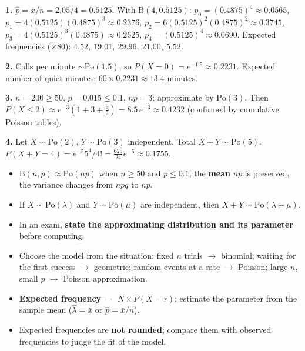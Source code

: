 \documentclass[11pt]{article}
\begin{document}
\begin{corrige}[Exercise 1]
\textbf{1.} $\hat p=\bar{x}/n=2.05/4=0.5125$. With $\mathrm{B}(4,0.5125)$: $p_0=(0.4875)^4\approx 0.0565$, $p_1=4(0.5125)(0.4875)^3\approx 0.2376$, $p_2=6(0.5125)^2(0.4875)^2\approx 0.3745$, $p_3=4(0.5125)^3(0.4875)\approx 0.2625$, $p_4=(0.5125)^4\approx 0.0690$. Expected frequencies ($\times 80$): $4.52,\ 19.01,\ 29.96,\ 21.00,\ 5.52$.

\textbf{2.} Calls per minute $\sim\mathrm{Po}(1.5)$, so $P(X=0)=e^{-1.5}\approx 0.2231$. Expected number of quiet minutes: $60\times 0.2231\approx 13.4$ minutes.

\textbf{3.} $n=200\geq 50$, $p=0.015\leq 0.1$, $np=3$: approximate by $\mathrm{Po}(3)$. Then $P(X\leq 2)\approx e^{-3}\left(1+3+\tfrac{9}{2}\right)=8.5\,e^{-3}\approx 0.4232$ (confirmed by cumulative Poisson tables).

\textbf{4.} Let $X\sim\mathrm{Po}(2)$, $Y\sim\mathrm{Po}(3)$ independent. Total $X+Y\sim\mathrm{Po}(5)$. $P(X+Y=4)=e^{-5}5^4/4! = \frac{625}{24}e^{-5}\approx 0.1755$.
\end{corrige}

\begin{aretenir}
\begin{itemize}
\item $\mathrm{B}(n,p)\approx\mathrm{Po}(np)$ when $n\geq 50$ and $p\leq 0.1$; the \textbf{mean} $np$ is preserved, the variance changes from $npq$ to $np$.
\item If $X\sim\mathrm{Po}(\lambda)$ and $Y\sim\mathrm{Po}(\mu)$ are independent, then $X+Y\sim\mathrm{Po}(\lambda+\mu)$.
\item In an exam, \textbf{state the approximating distribution and its parameter} before computing.
\item Choose the model from the situation: fixed $n$ trials $\to$ binomial; waiting for the first success $\to$ geometric; random events at a rate $\to$ Poisson; large $n$, small $p$ $\to$ Poisson approximation.
\item \textbf{Expected frequency} $=$ $N\times P(X=r)$; estimate the parameter from the sample mean ($\hat\lambda=\bar x$ or $\hat p=\bar x/n$).
\item Expected frequencies are \textbf{not rounded}; compare them with observed frequencies to judge the fit of the model.
\end{itemize}
\end{aretenir}

\newpage
\end{document}
